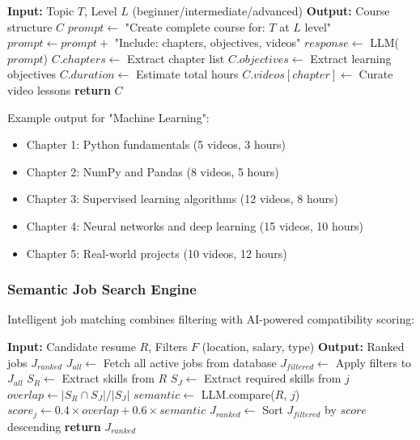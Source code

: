 \documentclass[conference]{IEEEtran}
\begin{document}
\begin{algorithm}[h]
\caption{Course Generation}
\label{alg:course_gen}
\begin{algorithmic}[1]
\STATE \textbf{Input:} Topic $T$, Level $L$ (beginner/intermediate/advanced)
\STATE \textbf{Output:} Course structure $C$
\STATE
\STATE $prompt \leftarrow$ "Create complete course for: $T$ at $L$ level"
\STATE $prompt \leftarrow prompt +$ "Include: chapters, objectives, videos"
\STATE $response \leftarrow$ LLM($prompt$)
\STATE $C.chapters \leftarrow$ Extract chapter list
\STATE $C.objectives \leftarrow$ Extract learning objectives
\STATE $C.duration \leftarrow$ Estimate total hours
    \STATE $C.videos[chapter] \leftarrow$ Curate video lessons
\ENDFOR
\STATE \textbf{return} $C$
\end{algorithmic}
\end{algorithm}

Example output for "Machine Learning":
\begin{itemize}
    \item Chapter 1: Python fundamentals (5 videos, 3 hours)
    \item Chapter 2: NumPy and Pandas (8 videos, 5 hours)
    \item Chapter 3: Supervised learning algorithms (12 videos, 8 hours)
    \item Chapter 4: Neural networks and deep learning (15 videos, 10 hours)
    \item Chapter 5: Real-world projects (10 videos, 12 hours)
\end{itemize}

\subsubsection{Semantic Job Search Engine}

Intelligent job matching combines filtering with AI-powered compatibility scoring:

\begin{algorithm}[h]
\caption{Semantic Job Matching}
\label{alg:job_match}
\begin{algorithmic}[1]
\STATE \textbf{Input:} Candidate resume $R$, Filters $F$ (location, salary, type)
\STATE \textbf{Output:} Ranked jobs $J_{ranked}$
\STATE
\STATE $J_{all} \leftarrow$ Fetch all active jobs from database
\STATE $J_{filtered} \leftarrow$ Apply filters to $J_{all}$
    \STATE $S_R \leftarrow$ Extract skills from $R$
    \STATE $S_J \leftarrow$ Extract required skills from $j$
    \STATE $overlap \leftarrow |S_R \cap S_J| / |S_J|$ 
    \STATE $semantic \leftarrow$ LLM.compare($R$, $j$) 
    \STATE $score_j \leftarrow 0.4 \times overlap + 0.6 \times semantic$
\ENDFOR
\STATE $J_{ranked} \leftarrow$ Sort $J_{filtered}$ by $score$ descending
\STATE \textbf{return} $J_{ranked}$
\end{algorithmic}
\end{algorithm}
\end{document}
